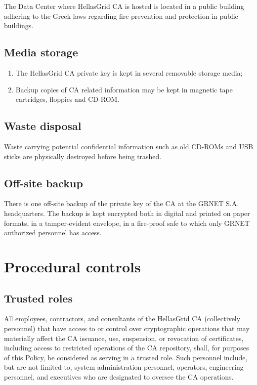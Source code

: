 The Data Center where HellasGrid CA is hosted is located in a public building adhering to the Greek laws regarding fire prevention and protection in public buildings.


\subsection{Media storage}
\label{sub:MediaStorage}

\begin{enumerate}
\item{The HellasGrid CA private key is kept in several removable storage media;}
\item{Backup copies of CA related information may be kept in magnetic tape cartridges, floppies and CD-ROM.}
\end{enumerate}

\subsection{Waste disposal}

Waste carrying potential confidential information such as old CD-ROMs and USB sticks are physically destroyed before being trashed.

\subsection{Off-site backup}

There is one off-site backup of the private key of the CA at the GRNET S.A. headquarters. The backup is kept encrypted both in digital and printed on paper formats, in a tamper-evident envelope, in a fire-proof safe to which only GRNET authorized personnel has access.

\section{Procedural controls}
\subsection{Trusted roles}

All employees, contractors, and consultants of the HellasGrid CA (collectively personnel) that have access to or control over cryptographic operations that may materially affect the CA issuance, use, suspension, or revocation of certificates, including access to restricted operations of the CA repository, shall, for purposes of this Policy, be considered as serving in a trusted role. Such personnel include, but are not limited to, system administration personnel, operators, engineering personnel, and executives who are designated to oversee the CA operations.

